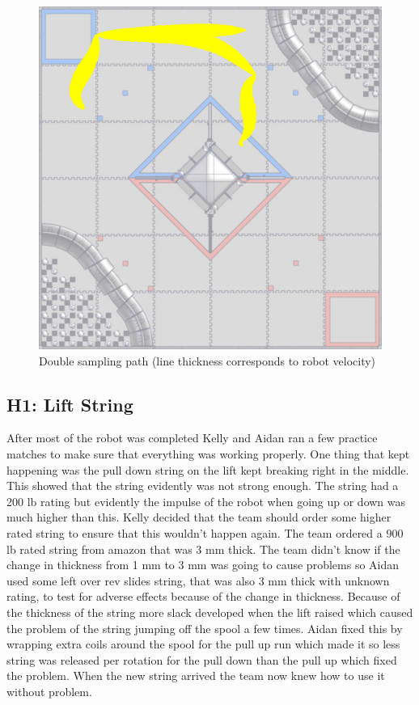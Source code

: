 \documentclass{article}
\begin{document}
\begin{figure}
    \centering
    \includegraphics[width=.6\textwidth]{22_01-28/images/double.png}
    \caption{Double sampling path (line thickness corresponds to robot velocity)}
    \label{fig:double}
\end{figure}
\subsection{H1: Lift String}

After most of the robot was completed Kelly and Aidan ran a few practice matches to make sure that everything was working properly. One thing that kept happening was the pull down string on the lift kept breaking right in the middle. This showed that the string evidently was not strong enough. The string had a 200 lb rating but evidently the impulse of the robot when going up or down was much higher than this. Kelly decided that the team should order some higher rated string to ensure that this wouldn't happen again. The team ordered a 900 lb rated string from amazon that was 3 mm thick. The team didn't know if the change in thickness from 1 mm  to 3 mm was going to cause problems so Aidan used some left over rev slides string, that was also 3 mm thick with unknown rating, to test for adverse effects because of the change in thickness. Because of the thickness of the string more slack developed when the lift raised which caused the problem of the string jumping off the spool a few times. Aidan fixed this by wrapping extra coils around the spool for the pull up run which made it so less string was released per rotation for the pull down than the pull up which fixed the problem. When the new string arrived the team now knew how to use it without problem.
\end{document}
